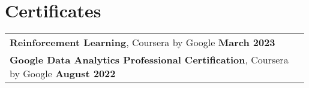 \documentclass[letterpaper,10pt]{article}
\begin{document}
\section{Certificates}
\begin{tabular}{p{0.99\linewidth}}
    \hspace{0.15in}\textbf{Reinforcement Learning}, Coursera by Google
        \hfill \textbf{March 2023} \\
    \hspace{0.15in}\textbf{Google Data Analytics Professional Certification}, Coursera by Google
        \hfill \textbf{August 2022} \\
\end{tabular}



\end{document}
